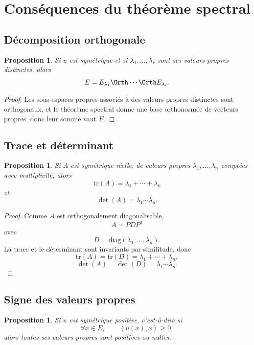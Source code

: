\documentclass[11pt,a4paper]{article}
\newtheorem{proposition}[definition]{Proposition}
\theoremstyle{remark}
\newcommand{\tr}{\mathrm{tr}}
\newcommand{\diag}{\mathrm{diag}}
\newcommand{\scal}[2]{\left\langle #1,#2\right\rangle}
\begin{document}
\section{Conséquences du théorème spectral}

\subsection{Décomposition orthogonale}

\begin{proposition}
Si \(u\) est symétrique et si \(\lambda_1,\dots,\lambda_r\) sont ses valeurs propres distinctes, alors
\[
E=E_{\lambda_1}\Orth \cdots \Orth E_{\lambda_r}.
\]
\end{proposition}

\begin{proof}
Les sous-espaces propres associés à des valeurs propres distinctes sont orthogonaux, et le théorème spectral donne une base orthonormée de vecteurs propres, donc leur somme vaut \(E\).
\end{proof}

\subsection{Trace et déterminant}

\begin{proposition}
Si \(A\) est symétrique réelle, de valeurs propres \(\lambda_1,\dots,\lambda_n\) comptées avec multiplicité, alors
\[
\tr(A)=\lambda_1+\cdots+\lambda_n
\]
et
\[
\det(A)=\lambda_1\cdots \lambda_n.
\]
\end{proposition}

\begin{proof}
Comme \(A\) est orthogonalement diagonalisable,
\[
A=PDP^T
\]
avec
\[
D=\diag(\lambda_1,\dots,\lambda_n).
\]
La trace et le déterminant sont invariants par similitude, donc
\[
\tr(A)=\tr(D)=\lambda_1+\cdots+\lambda_n,
\]
\[
\det(A)=\det(D)=\lambda_1\cdots \lambda_n.
\]
\end{proof}

\subsection{Signe des valeurs propres}

\begin{proposition}
Si \(u\) est symétrique positive, c’est-à-dire si
\[
\forall x\in E,\qquad \scal{u(x)}{x}\ge 0,
\]
alors toutes ses valeurs propres sont positives ou nulles.
\end{proposition}
\end{document}
